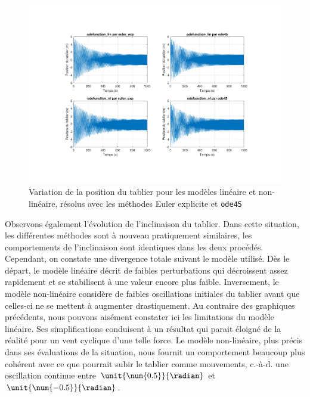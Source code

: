 \documentclass[a4paper, 12pt]{article}
\begin{document}
	\begin{figure}[H]
		\centering
		\includegraphics[width = \textwidth]{resources/pdf/Q2_position.pdf}
		\caption{Variation de la position du tablier pour les modèles linéaire et non-linéaire, résolus avec les méthodes Euler explicite et \texttt{ode45}}
	\end{figure}
	Observons également l’évolution de l’inclinaison du tablier. Dans cette situation, les différentes méthodes sont à nouveau pratiquement similaires, les comportements de l’inclinaison sont identiques dans les deux procédés. Cependant, on constate une divergence totale suivant le modèle utilisé. Dès le départ, le modèle linéaire décrit de faibles perturbations qui décroissent assez rapidement et se stabilisent à une valeur encore plus faible. Inversement, le modèle non-linéaire considère de faibles oscillations initiales du tablier avant que celles-ci ne se mettent à augmenter drastiquement. Au contraire des graphiques précédents, nous pouvons aisément constater ici les limitations du modèle linéaire. Ses simplifications conduisent à un résultat qui parait éloigné de la réalité pour un vent cyclique d'une telle force. Le modèle non-linéaire, plus précis dans ses évaluations de la situation, nous fournit un comportement beaucoup plus cohérent avec ce que pourrait subir le tablier comme mouvements, c.-à-d. une oscillation continue entre $\unit{\num{0.5}}{\radian}$ et $\unit{\num{-0.5}}{\radian}$.
\end{document}
